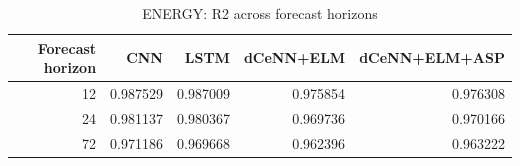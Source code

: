 \begin{table}
\caption{ENERGY: R2 across forecast horizons}
\begin{tabular}{rrrrr}
\toprule
Forecast horizon & CNN & LSTM & dCeNN+ELM & dCeNN+ELM+ASP \\
\midrule
12 & 0.987529 & 0.987009 & 0.975854 & 0.976308 \\
24 & 0.981137 & 0.980367 & 0.969736 & 0.970166 \\
72 & 0.971186 & 0.969668 & 0.962396 & 0.963222 \\
\bottomrule
\end{tabular}
\end{table}
